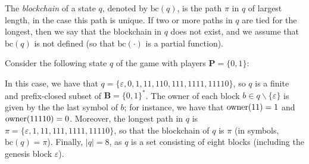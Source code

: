 \documentclass[a4paper,english,cleveref, autoref,numberwithinsect]{lipics-v2019}
\newcommand{\francisco}[1]{{\color{magenta} {\bf Francisco: #1}}}
\newcommand{\bchain}{\text{bc}}
\newcommand{\epath}{\text{path}}
\newcommand{\owner}{\text{\rm owner}}
\newcommand{\bP}{\mathbf{P}}
\newcommand{\bB}{\mathbf{B}}
\begin{document}
The {\em blockchain} of a state $q$, denoted by $\bchain(q)$, is the path $\pi$ in $q$ of largest length, in the case this path is unique.
If two or more paths in $q$ are tied for the longest, then we say that the blockchain in $q$ does not exist, and we assume that $\bchain(q)$ is not defined (so that $\bchain(\cdot)$ is a partial function). %
%
\begin{example}\label{ex-mining}
Consider the following state $q$ of the game with players $\bP =\{0,1\}$:
\vspace*{-9pt}
\begin{center}
\end{center}
\vspace*{-9pt}
In this case, we have that $q = \{\varepsilon, 0, 1, 11, 110, 111, 1111, 11110\}$, so $q$ is a finite and prefix-closed subset of $\bB = \{0,1\}^*$. The owner of each block $b \in q \smallsetminus \{ \varepsilon\}$ is given by the the last symbol of $b$; for instance, we have that $\owner(11) = 1$ and $\owner(11110) = 0$. Moreover, the longest path in $q$ is $\pi = \{\varepsilon, 1, 11, 111, 1111, 11110\}$, so that the blockchain of $q$ is $\pi$ (in symbols, $\bchain(q) = \pi$).
Finally, 
$|q| = 8$, as $q$ is a set consisting of eight blocks (including the genesis block $\varepsilon$). 


\end{example}
\end{document}
